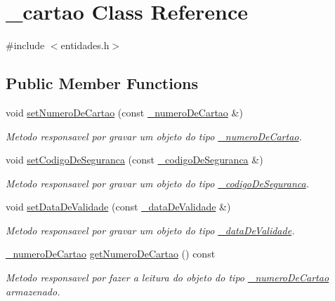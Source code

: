 \hypertarget{class__cartao}{}\section{\+\_\+cartao Class Reference}
\label{class__cartao}


{\ttfamily \#include $<$entidades.\+h$>$}

\subsection*{Public Member Functions}
\begin{DoxyCompactItemize}
\item 
void \mbox{\hyperlink{class__cartao_a3ffa86a6968da810868217e983ff6fbf}{set\+Numero\+De\+Cartao}} (const \mbox{\hyperlink{class__numero_de_cartao}{\+\_\+numero\+De\+Cartao}} \&)
\begin{DoxyCompactList}\small\item\em Metodo responsavel por gravar um objeto do tipo \mbox{\hyperlink{class__numero_de_cartao}{\+\_\+numero\+De\+Cartao}}. \end{DoxyCompactList}\item 
void \mbox{\hyperlink{class__cartao_ad0c4c3f035c90eb7e879b8558e9d46d5}{set\+Codigo\+De\+Seguranca}} (const \mbox{\hyperlink{class__codigo_de_seguranca}{\+\_\+codigo\+De\+Seguranca}} \&)
\begin{DoxyCompactList}\small\item\em Metodo responsavel por gravar um objeto do tipo \mbox{\hyperlink{class__codigo_de_seguranca}{\+\_\+codigo\+De\+Seguranca}}. \end{DoxyCompactList}\item 
void \mbox{\hyperlink{class__cartao_a2b21966a565326b330d43cf4e01bfa6b}{set\+Data\+De\+Validade}} (const \mbox{\hyperlink{class__data_de_validade}{\+\_\+data\+De\+Validade}} \&)
\begin{DoxyCompactList}\small\item\em Metodo responsavel por gravar um objeto do tipo \mbox{\hyperlink{class__data_de_validade}{\+\_\+data\+De\+Validade}}. \end{DoxyCompactList}\item 
\mbox{\hyperlink{class__numero_de_cartao}{\+\_\+numero\+De\+Cartao}} \mbox{\hyperlink{class__cartao_adb85e866622841d0915b36f2f76e8019}{get\+Numero\+De\+Cartao}} () const
\begin{DoxyCompactList}\small\item\em Metodo responsavel por fazer a leitura do objeto do tipo \mbox{\hyperlink{class__numero_de_cartao}{\+\_\+numero\+De\+Cartao}} armazenado. \end{DoxyCompactList}\item 

\end{DoxyCompactItemize}
